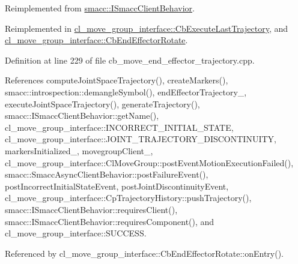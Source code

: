 Reimplemented from \hyperlink{classsmacc_1_1ISmaccClientBehavior_a3ec24a839087c550e1d62a81e48cf530}{smacc\+::\+I\+Smacc\+Client\+Behavior}.



Reimplemented in \hyperlink{classcl__move__group__interface_1_1CbExecuteLastTrajectory_ac78713663c39635ca5ac9a749503e800}{cl\+\_\+move\+\_\+group\+\_\+interface\+::\+Cb\+Execute\+Last\+Trajectory}, and \hyperlink{classcl__move__group__interface_1_1CbEndEffectorRotate_a3e60bfba48906696587d66af89f7ee2b}{cl\+\_\+move\+\_\+group\+\_\+interface\+::\+Cb\+End\+Effector\+Rotate}.



Definition at line 229 of file cb\+\_\+move\+\_\+end\+\_\+effector\+\_\+trajectory.\+cpp.



References compute\+Joint\+Space\+Trajectory(), create\+Markers(), smacc\+::introspection\+::demangle\+Symbol(), end\+Effector\+Trajectory\+\_\+, execute\+Joint\+Space\+Trajectory(), generate\+Trajectory(), smacc\+::\+I\+Smacc\+Client\+Behavior\+::get\+Name(), cl\+\_\+move\+\_\+group\+\_\+interface\+::\+I\+N\+C\+O\+R\+R\+E\+C\+T\+\_\+\+I\+N\+I\+T\+I\+A\+L\+\_\+\+S\+T\+A\+TE, cl\+\_\+move\+\_\+group\+\_\+interface\+::\+J\+O\+I\+N\+T\+\_\+\+T\+R\+A\+J\+E\+C\+T\+O\+R\+Y\+\_\+\+D\+I\+S\+C\+O\+N\+T\+I\+N\+U\+I\+TY, markers\+Initialized\+\_\+, movegroup\+Client\+\_\+, cl\+\_\+move\+\_\+group\+\_\+interface\+::\+Cl\+Move\+Group\+::post\+Event\+Motion\+Execution\+Failed(), smacc\+::\+Smacc\+Async\+Client\+Behavior\+::post\+Failure\+Event(), post\+Incorrect\+Initial\+State\+Event, post\+Joint\+Discontinuity\+Event, cl\+\_\+move\+\_\+group\+\_\+interface\+::\+Cp\+Trajectory\+History\+::push\+Trajectory(), smacc\+::\+I\+Smacc\+Client\+Behavior\+::requires\+Client(), smacc\+::\+I\+Smacc\+Client\+Behavior\+::requires\+Component(), and cl\+\_\+move\+\_\+group\+\_\+interface\+::\+S\+U\+C\+C\+E\+SS.



Referenced by cl\+\_\+move\+\_\+group\+\_\+interface\+::\+Cb\+End\+Effector\+Rotate\+::on\+Entry().


